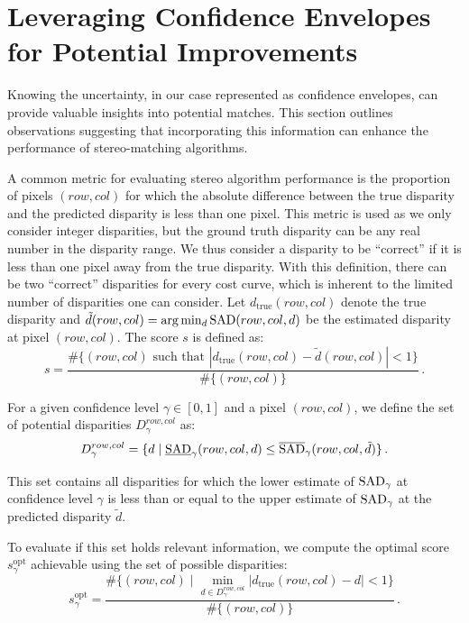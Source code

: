 \section{Leveraging Confidence Envelopes for Potential Improvements}

Knowing the uncertainty, in our case represented as confidence envelopes, can provide valuable insights into potential matches. This section outlines observations suggesting that incorporating this information can enhance the performance of stereo-matching algorithms.

A common metric for evaluating stereo algorithm performance is the proportion of pixels $(row, col)$ for which the absolute difference between the true disparity and the predicted disparity is less than one pixel. This metric is used as we only consider integer disparities, but the ground truth disparity can be any real number in the disparity range. We thus consider a disparity to be ``correct'' if it is less than one pixel away from the true disparity. With this definition, there can be two ``correct'' disparities for every cost curve, which is inherent to the limited number of disparities one can consider. Let $d_{\mathrm{true}}(row, col)$ denote the true disparity and $\tilde{d}(row, col) = \arg \min_d {\mathrm{SAD}}(row, col, d)$ be the estimated disparity at pixel $(row, col)$. The score \( s \) is defined as:
\begin{equation}
    s = \frac{\#\{(row, col) \text{ such that } |d_{\mathrm{true}}(row, col) - \tilde{d}(row, col)| < 1\}}{\#\{(row, col)\}}\,.
\end{equation}

For a given confidence level $\gamma \in [0, 1]$ and a pixel $(row, col)$, we define the set of potential disparities $D_\gamma^{row, col}$ as:
\begin{equation}
    D_\gamma^{row, col} = \{d \mid \underline{{\mathrm{SAD}}}_\gamma(row, col, d) \leq \overline{{\mathrm{SAD}}}_\gamma(row, col, \tilde{d})\}\,.
\end{equation}

This set contains all disparities for which the lower estimate of ${\mathrm{SAD}}_\gamma$ at confidence level $\gamma$ is less than or equal to the upper estimate of ${\mathrm{SAD}}_\gamma$ at the predicted disparity $\tilde{d}$.

To evaluate if this set holds relevant information, we compute the optimal score \( s_\gamma^{\text{opt}} \) achievable using the set of possible disparities:
\begin{equation}
    s_\gamma^{\text{opt}} = \frac{\#\{(row, col) \mid \min_{d \in D_\gamma^{row, col}} |d_{\mathrm{true}}(row, col) - d| < 1\}}{\#\{(row, col)\}}\,.
\end{equation}

